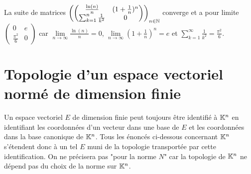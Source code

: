 \documentclass{book}
\begin{document}
\begin{Exemple}
La suite de matrices $\left(\begin{pmatrix}
\frac{\ln(n)}{n}& (1+\frac{1}{n})^n\\ \sum_{k=1}^{n}\frac{1}{k^2}&0
\end{pmatrix}\right)_{n\in\mathbb{N}}$ converge et a pour limite $\begin{pmatrix}
0& e\\ \frac{\pi^2}{6}&0
\end{pmatrix}$ car $\lim\limits_{n\to\infty}\frac{\ln(n)}{n}=0$, $\lim\limits_{n\to\infty}(1+\frac{1}{n})^n=e$ et $\sum_{k=1}^{\infty}\frac{1}{k^2}=\frac{\pi^2}{6}$.
\end{Exemple}

%
\section{Topologie d'un espace vectoriel normé de dimension finie}
Un espace vectoriel $E$ de dimension finie peut toujours être identifié à $\mathbb{K}^n$ en identifiant les coordonnées d'un vecteur dans une base de $E$ et les coordonnées dans la base canonique de $\mathbb{K}^n$. Tous les énoncés ci-dessous concernant $\mathbb{K}^n$ s'étendent donc à un tel $E$ muni de la topologie transportée par cette identification. On ne précisera pas "pour la norme $N$" car  la topologie de $\mathbb{K}^n$ ne dépend pas du choix de la norme sur $\mathbb{K}^n$. 
\end{document}
